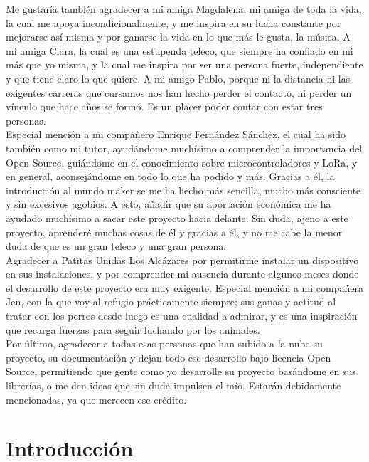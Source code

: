 \documentclass[12pt]{article}
\begin{document}
	\noindent Me gustaría también agradecer a mi amiga Magdalena, mi amiga de toda la vida, la cual me apoya incondicionalmente, y me inspira en su lucha constante por mejorarse así misma y por ganarse la vida en lo que más le gusta, la música. A mi amiga Clara, la cual es una estupenda teleco, que siempre ha confiado en mi más que yo misma, y la cual me inspira por ser una persona fuerte, independiente y que tiene claro lo que quiere. A mi amigo Pablo, porque ni la distancia ni las exigentes carreras que cursamos nos han hecho perder el contacto, ni perder un vínculo que hace años se formó. Es un placer poder contar con estar tres personas.\\  
	
	\noindent Especial mención a mi compañero Enrique Fernández Sánchez, el cual ha sido también como mi tutor, ayudándome muchísimo a comprender la importancia del Open Source, guiándome en el conocimiento sobre microcontroladores y LoRa, y en general, aconsejándome en todo lo que ha podido y más. Gracias a él, la introducción al mundo maker se me ha hecho más sencilla, mucho más consciente y sin excesivos agobios. A esto, añadir que su aportación económica me ha ayudado muchísimo a sacar este proyecto hacia delante. Sin duda, ajeno a este proyecto, aprenderé muchas cosas de él y gracias a él, y no me cabe la menor duda de que es un gran teleco y una gran persona.\\
	
	\noindent Agradecer a Patitas Unidas Los Alcázares por permitirme instalar un dispositivo en sus instalaciones, y por comprender mi ausencia durante algunos meses donde el desarrollo de este proyecto era muy exigente. Especial mención a mi compañera Jen, con la que voy al refugio prácticamente siempre; sus ganas y actitud al tratar con los perros desde luego es una cualidad a admirar, y es una inspiración que recarga fuerzas para seguir luchando por los animales.\\
	
	\noindent Por último, agradecer a todas esas personas que han subido a la nube su proyecto, su documentación y dejan todo ese desarrollo bajo licencia Open Source, permitiendo que gente como yo desarrolle su proyecto basándome en sus librerías, o me den ideas que sin duda impulsen el mío. Estarán debidamente mencionadas, ya que merecen ese crédito.\\
	
	\pagebreak
	
	\section[Introducción]{Introducción} %
	
\end{document}
